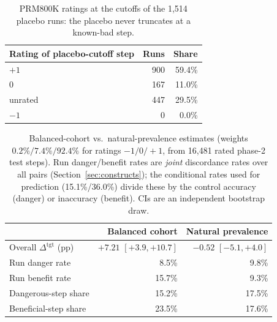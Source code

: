 \documentclass[11pt]{article}
\newcommand{\ci}[2]{[#1, #2]}
\begin{document}
\begin{table}[h]
\centering
\small
\begin{tabular}{@{}lrr@{}}
\toprule
Rating of placebo-cutoff step & Runs & Share \\
\midrule
$+1$    & 900 & 59.4\% \\
$0$     & 167 & 11.0\% \\
unrated & 447 & 29.5\% \\
$-1$    & 0   & 0.0\% \\
\bottomrule
\end{tabular}
\caption{PRM800K ratings at the cutoffs of the 1{,}514 placebo runs: the placebo never truncates at a known-bad step.}
\label{tab:placebocomp}
\end{table}

\begin{table}[h]
\centering
\scriptsize
\setlength{\tabcolsep}{3pt}
\begin{tabular}{@{}lrr@{}}
\toprule
 & Balanced cohort & Natural prevalence \\
\midrule
Overall $\Delta^{\mathrm{tgt}}$ (pp) & $+7.21$ $\ci{+3.9}{+10.7}$ & $-0.52$ $\ci{-5.1}{+4.0}$ \\
Run danger rate    & 8.5\%  & 9.8\% \\
Run benefit rate   & 15.7\% & 9.3\% \\
Dangerous-step share  & 15.2\% & 17.5\% \\
Beneficial-step share & 23.5\% & 17.6\% \\
\bottomrule
\end{tabular}
\caption{Balanced-cohort vs.\ natural-prevalence estimates (weights $0.2\%/7.4\%/92.4\%$ for ratings $-1/0/{+}1$, from 16{,}481 rated phase-2 test steps). Run danger/benefit rates are \emph{joint} discordance rates over all pairs (Section~\ref{sec:constructs}); the conditional rates used for prediction (15.1\%/36.0\%) divide these by the control accuracy (danger) or inaccuracy (benefit). CIs are an independent bootstrap draw.}
\label{tab:natprev}
\end{table}
\end{document}
